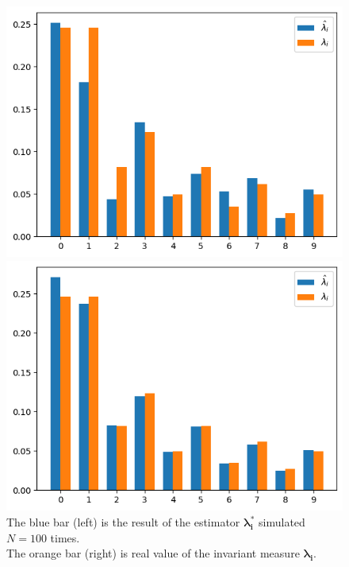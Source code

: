 \begin{figure}[H]
    \centering
    \begin{minipage}[b]{0.49\textwidth}
        \centering
        \includegraphics[width=\textwidth]{../pictures/2.e.8.png}
        \caption*{$N = 100,\; T = 100$}
    \end{minipage}
    \hfill
    \begin{minipage}[b]{0.49\textwidth}
        \centering
        \includegraphics[width=\textwidth]{../pictures/2.e.7.png}
        \caption*{$N = 100,\; T = 1000$}
    \end{minipage}
    \caption*{The {\color{blue} blue bar (left)} is the result of the estimator {\color{blue}$\boldsymbol{\lambda_i^*}$} simulated $N = 100$ times.\\ The {\color{red} orange bar (right)} is real value of the invariant measure {\color{red}$\boldsymbol{\lambda_i}$}. }
\end{figure}

